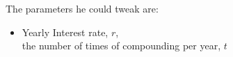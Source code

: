 \documentclass[preview]{standalone}
\begin{document}
\begin{center}
The parameters he could tweak are: \\ \begin{itemize} \item Yearly Interest rate, $r$, \\ the number of times of compounding per year, $t$ \\ \end{itemize}
\end{center}
\end{document}
